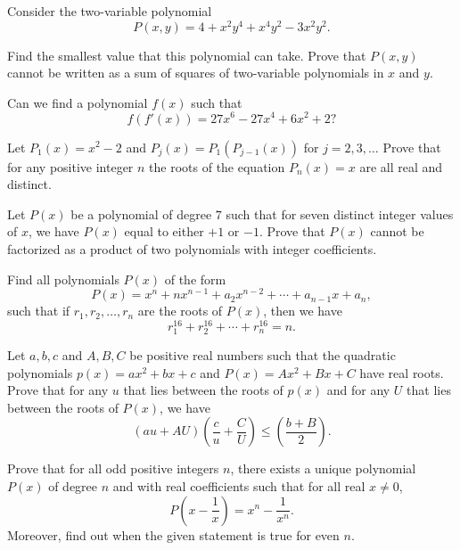 \documentclass[12pt,a4paper]{memoir}
\theoremstyle{definition}
\begin{document}
\begin{question}[name={1981 USSR}]
	Consider the two-variable polynomial
	\[P(x,y) = 4 + x^2y^4 + x^4y^2 - 3x^2y^2.\]
	\begin{tasks}
		\task Find the smallest value that this polynomial can take.
		\task Prove that $P(x,y)$ cannot be written as a sum of squares of two-variable polynomials in $x$ and $y$.
	\end{tasks}
\end{question}


\begin{question}
	Can we find a polynomial $f(x)$ such that
	\[f(f'(x)) = 27x^6 - 27x^4 + 6x^2 + 2?\]
\end{question}

\begin{question}[name={1976 International Mathematics Olympiad}]
	Let $P_{1}(x)=x^{2}-2$ and $P_{j}(x)=P_{1}(P_{j-1}(x))$ for $j=2,3,\dots$ Prove that for any positive integer $n$ the roots of the equation $P_{n}(x)=x$ are all real and distinct.
\end{question}


\begin{question}
	Let $P(x)$ be a polynomial of degree $7$ such that for seven distinct integer values of $x$, we have $P(x)$ equal to either $+1$ or $-1$. Prove that $P(x)$ cannot be factorized as a product of two polynomials with integer coefficients.
\end{question}


\begin{question}
	Find all polynomials $P(x)$ of the form
	\[P(x) = x^n + nx^{n-1} + a_2x^{n-2} + \cdots + a_{n-1}x + a_n,\]
	such that if $r_1,r_2,\dots,r_n$ are the roots of $P(x)$, then we have
	\[r_1^{16} + r_2^{16} + \cdots + r_n^{16}=n.\]
\end{question}



\begin{question}[name={1994 Romania}]
	Let $a,b,c$ and $A,B,C$ be positive real numbers such that the quadratic polynomials $p(x)=ax^2+bx+c$ and $P(x)=Ax^2+Bx+C$ have real roots. Prove that for any $u$ that lies between the roots of $p(x)$ and for any $U$ that lies between the roots of $P(x)$, we have
	\[(au+AU)\left(\frac{c}{u}+\frac{C}{U}\right) \leq \left(\frac{b+B}{2}\right).\]
\end{question}

\begin{question}[name={1998 Vietnam}]
	Prove that for all odd positive integers $n$, there exists a unique polynomial $P(x)$ of degree $n$ and with real coefficients such that for all real $x\neq 0$,
	\[P\left(x-\frac{1}{x}\right) = x^n - \frac{1}{x^n}.\]
	Moreover, find out when the given statement is true for even $n$.
\end{question}
\end{document}
